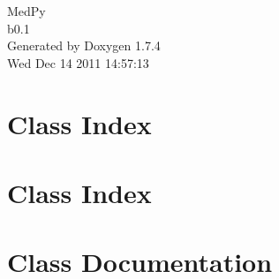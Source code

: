 \documentclass[a4paper]{book}
\begin{document}
\hypersetup{pageanchor=false}
\begin{titlepage}
\vspace*{7cm}
\begin{center}
{\Large MedPy \\[1ex]\large b0.1 }\\
\vspace*{1cm}
{\large Generated by Doxygen 1.7.4}\\
\vspace*{0.5cm}
{\small Wed Dec 14 2011 14:57:13}\\
\end{center}
\end{titlepage}
\clearemptydoublepage
{}
\tableofcontents
\clearemptydoublepage
{}
\hypersetup{pageanchor=true}
\chapter{Class Index}

\chapter{Class Index}

\chapter{Class Documentation}














\printindex
\end{document}
